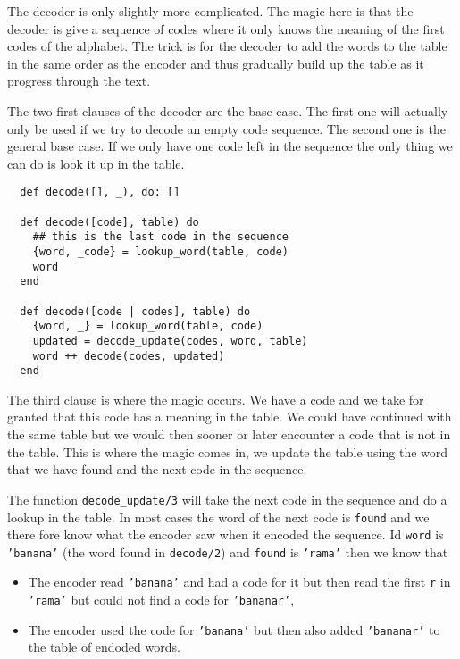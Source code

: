 \documentclass[a4paper,11pt]{article}
\begin{document}
The decoder is only slightly more complicated. The magic here is that
the decoder is give a sequence of codes where it only knows the
meaning of the first codes of the alphabet. The trick is for the
decoder to add the words to the table in the same order as the encoder
and thus gradually build up the table as it progress through the text.

The two first clauses of the decoder are the base case. The first one
will actually only be used if we try to decode an empty code
sequence. The second one is the general base case. If we only have one
code left in the sequence the only thing we can do is look it up in the
table.

\begin{verbatim}
  def decode([], _), do: []
  
  def decode([code], table) do
    ## this is the last code in the sequence
    {word, _code} = lookup_word(table, code)
    word
  end

  def decode([code | codes], table) do
    {word, _} = lookup_word(table, code)
    updated = decode_update(codes, word, table)
    word ++ decode(codes, updated)
  end
\end{verbatim}

The third clause is where the magic occurs. We have a code and we take
for granted that this code has a meaning in the table. We could have
continued with the same table but we would then sooner or later
encounter a code that is not in the table. This is where the magic
comes in, we update the table using the word that we have found and
the next code in the sequence.

The function {\tt decode\_update/3} will take the next code in the
sequence and do a lookup in the table. In most cases the word of the
next code is {\tt found} and we there fore know what the encoder saw
when it encoded the sequence. Id {\tt word} is {\tt 'banana'} (the word
found in {\tt decode/2}) and {\tt found} is {\tt 'rama'} then we know that

\begin{itemize}
\item The encoder read {\tt 'banana'} and had a code for it but then
  read the first {\tt r} in {\tt 'rama'} but could not find a code for {\tt 'bananar'},
  
\item The encoder used the code for {\tt 'banana'} but then also added
  {\tt 'bananar'} to the table of endoded words.
\end{itemize}
\end{document}
